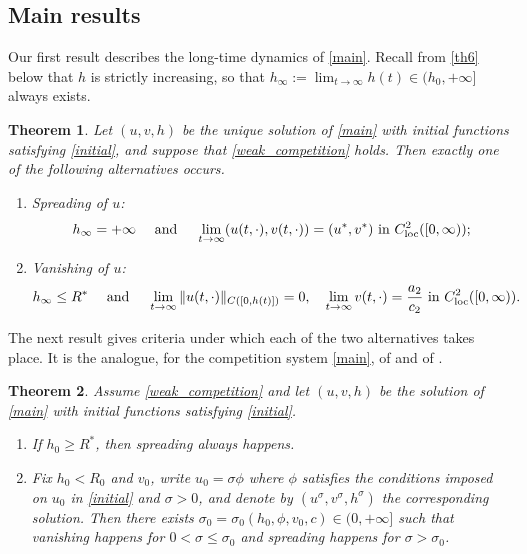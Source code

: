 \documentclass[reqno]{amsart}
\theoremstyle{plain}
\newtheorem{theorem}{Theorem}
\theoremstyle{definition}
\theoremstyle{remark}
\begin{document}
\subsection{Main results}

Our first result describes the long-time dynamics of \eqref{main}. Recall from
\cref{th6} below that $h$ is strictly increasing, so that
$h_\infty:=\lim_{t\to\infty}h(t)\in(h_0,+\infty]$ always exists.

\begin{theorem}\label{th:dynamics}
	Let $(u, v, h)$ be the unique solution of \eqref{main} with initial functions
	satisfying \eqref{initial}, and suppose that \eqref{weak_competition} holds.
	Then exactly one of the following alternatives occurs.
	\begin{enumerate}
		\item[(i)] \textit{Spreading of $u$}:
		\[
		h_\infty = +\infty \quad\text{ and }\quad \lim_{t\to\infty} (u(t,\cdot), v(t,\cdot)) = (u^*, v^*) \text{ in } C^2_{\rm loc}([0, \infty));
		\]
		\item[(ii)] \textit{Vanishing of $u$}:
		\[
		h_\infty \le R^* \quad\text{ and }\quad
		\lim_{t\to\infty} \|u(t,\cdot)\|_{C([0,h(t)])}=0,\quad
		\lim_{t\to\infty} v(t,\cdot) = \frac{a_2}{c_2} \text{ in } C^2_{\rm loc}([0, \infty)).
		\]
	\end{enumerate}
\end{theorem}

The next result gives criteria under which each of the two alternatives takes
place. It is the analogue, for the competition system \eqref{main}, of
\cite[Theorem 1.5]{HU20205931} and of \cite[Theorem 1.2]{MR3986328}.

\begin{theorem}\label{th:criteria}
	Assume \eqref{weak_competition} and let $(u,v,h)$ be the solution of
	\eqref{main} with initial functions satisfying \eqref{initial}.
	\begin{enumerate}
		\item[(i)] If $h_0\ge R^*$, then spreading always happens.
		\item[(ii)] Fix $h_0<R_0$ and $v_0$, write $u_0=\sigma\phi$ where $\phi$
		satisfies the conditions imposed on $u_0$ in \eqref{initial} and
		$\sigma>0$, and denote by $(u^\sigma,v^\sigma,h^\sigma)$ the corresponding
		solution. Then there exists
		$\sigma_0=\sigma_0(h_0,\phi,v_0,c)\in(0,+\infty]$ such that vanishing
		happens for $0<\sigma\le\sigma_0$ and spreading happens for
		$\sigma>\sigma_0$.
	\end{enumerate}
\end{theorem}
\end{document}
